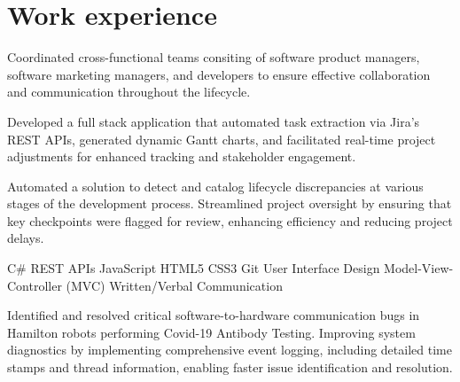\documentclass[]{farzad-resume}
\begin{document}
\begin{minipage}[t]{\textwidth}



\section{Work experience}

\vspace{\topsep}
\begin{tightemize}
    {\fontsize{8}{10.4} \selectfont 
	\item Coordinated cross-functional teams consiting of software product managers, software marketing managers, and developers to ensure effective collaboration and communication throughout the lifecycle.
	\item Developed a full stack application that automated task extraction via Jira's REST APIs, generated dynamic Gantt charts, and facilitated real-time project adjustments for enhanced tracking and stakeholder engagement.
	\item  Automated a solution to detect and catalog lifecycle discrepancies at various stages of the development process. Streamlined project oversight by ensuring that key checkpoints were flagged for review, enhancing efficiency and reducing project delays. }
\end{tightemize}

\begin{skillsection}
{ C\# \textbullet{} REST APIs \textbullet{} JavaScript \textbullet{} HTML5 \textbullet{} CSS3 \textbullet{} Git \textbullet{} User Interface Design \textbullet{} Model-View-Controller (MVC) \textbullet{} Written/Verbal Communication}
\end{skillsection}

\sectionsep

\vspace{\topsep}
\begin{tightemize}
{\fontsize{8}{10.4} \selectfont 
\item Identified and resolved critical software-to-hardware communication bugs in Hamilton robots performing Covid-19 Antibody Testing. Improving system diagnostics by implementing comprehensive event logging, including detailed time stamps and thread information, enabling faster issue identification and resolution.

}
\end{tightemize}
\end{minipage}
\end{document}
